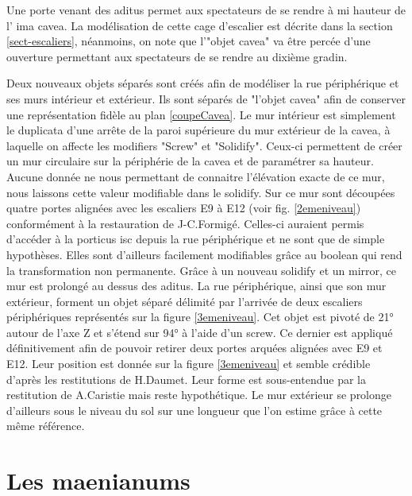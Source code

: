 Une porte venant des  \gls{aditus} permet aux spectateurs de se rendre à mi hauteur de l' \gls{ima cavea}. La modélisation de cette cage d'escalier est décrite dans la section \ref{sect-escaliers}, néanmoins, on note que l'"objet cavea" va être percée d'une ouverture permettant aux spectateurs de se rendre au dixième gradin.

Deux nouveaux objets séparés sont créés afin de modéliser la rue périphérique et ses murs intérieur et extérieur. Ils sont séparés de "l'objet cavea" afin de conserver une représentation fidèle au plan \ref{coupeCavea}. Le mur intérieur est simplement le duplicata d'une arrête de la paroi supérieure du mur extérieur de la \gls{cavea}, à laquelle on affecte les \glspl{modifier} "Screw" et "Solidify". Ceux-ci permettent de créer un mur circulaire sur la périphérie de la \gls{cavea} et de paramétrer sa hauteur. Aucune donnée ne nous permettant de connaitre l'élévation exacte de ce mur, nous laissons cette valeur modifiable dans le \gls{solidify}. Sur ce mur sont découpées quatre portes alignées avec les escaliers E9 à E12 (voir fig. \ref{2emeniveau}) conformément à la restauration de J-C.Formigé. Celles-ci auraient permis d'accéder à la \gls{porticus isc} depuis la rue périphérique et ne sont que de simple hypothèses. Elles sont d'ailleurs facilement modifiables grâce au \gls{boolean} qui rend la transformation non permanente. Grâce à un nouveau \gls{solidify} et un \gls{mirror}, ce mur est prolongé au dessus des \gls{aditus}. La rue périphérique, ainsi que son mur extérieur, forment un objet séparé délimité par l'arrivée de deux escaliers périphériques représentés sur la figure \ref{3emeniveau}. Cet objet est pivoté de 21° autour de l'axe Z et s'étend sur 94° à l'aide d'un \gls{screw}. Ce dernier est appliqué définitivement afin de pouvoir retirer deux portes arquées alignées avec E9 et E12. Leur position est donnée sur la figure \ref{3emeniveau} et semble crédible d'après les restitutions de H.Daumet. Leur forme est sous-entendue par la restitution de A.Caristie \cite[Pl. VI]{orangePl} mais reste hypothétique. Le mur extérieur se prolonge d'ailleurs sous le niveau du sol sur une longueur que l'on estime grâce à cette même référence. 


\section{Les  \glspl{maenianum}} \label{sect-maenianum}


